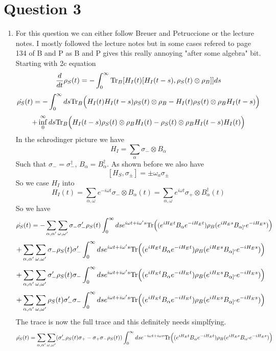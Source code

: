 \documentclass[12pt]{article}
\newcommand{\Tr}{{\rm Tr}}
\begin{document}
\section{Question 3}
\begin{enumerate}
\item For this question we can either follow Breuer and Petruccione or the lecture notes. I mostly followed the lecture notes but in some cases refered to page 134 of B and P as B and P gives this really annoying "after some algebra" bit. Starting with 2c equation 
$$ \frac{d}{dt} \rho_S (t) = - \int_0^{\infty} \Tr_B [ H_I (t) [H_I (t-s), \rho_S (t) \otimes \rho_B]] ds $$
$$ \dot{\rho_S} (t) = - \int_0^{\infty} ds \Tr_B \Big( H_I (t) H_I (t-s) \rho_S (t) \otimes \rho_B - H_I (t) \rho_S (t) \otimes  \rho_B H_I (t-s) \Big) $$
 $$ + \inf_0^{\infty} ds \Tr_B \Big( H_I (t-s) \rho_S (t) \otimes \rho_B H_I (t) - \rho_S (t) \otimes \rho_B H_I (t-s) H_I (t) \Big) $$
 In the schrodinger picture we have 
$$ H_I = \sum_{\alpha} \sigma_- \otimes B_{\alpha} $$
Such that $\sigma_- = \sigma_-^{\dagger}$, $B_{\alpha} = B_{\alpha}^{\dagger}$. As shown before we also have 
$$ [H_S, \sigma_{\pm} ] = \pm \omega_a \sigma_{\pm} $$
So we case $H_I$ into 
$$ H_I (t) = \sum_{\alpha, \omega} e^{-i \omega t} \sigma_- \otimes B_{\alpha} (t) = \sum_{\alpha, \omega} e^{i \omega t} \sigma_+ \otimes B_{\alpha}^{\dagger} (t) $$
So we have 
$$ \dot{\rho_S} (t) = - \sum_{\alpha, \alpha'} \sum_{\omega, \omega'} \sigma_- \sigma_{-}' \rho_S (t) \int_0^{\infty} ds e^{i \omega t + i \omega' s} \Tr \Big( (e^{i H_E t} B_{\alpha} e^{-i H_E t} ) \rho_B ( e^{i H_E s} B_{\alpha]' } e^{-i H_E s} ) \Big) $$
$$ + \sum_{\alpha, \alpha'} \sum_{\omega, \omega'} \sigma_- \rho_S (t) \sigma_{-}' \int_0^{\infty} ds e^{i \omega t + i \omega' s} \Tr \Big( (e^{i H_E t} B_{\alpha} e^{-i H_E t} ) \rho_B ( e^{i H_E s} B_{\alpha]' } e^{-i H_E s} ) \Big) $$
$$ + \sum_{\alpha, \alpha'} \sum_{\omega, \omega'} \sigma_{-}' \rho_S (t) \sigma_- \int_0^{\infty} ds e^{i \omega t + i \omega' s} \Tr \Big( (e^{i H_E t} B_{\alpha} e^{-i H_E t} ) \rho_B ( e^{i H_E s} B_{\alpha]' } e^{-i H_E s} ) \Big) $$
$$ + \sum_{\alpha, \alpha'} \sum_{\omega, \omega'} \rho_S (t) \sigma_{-}' \sigma_-   \int_0^{\infty} ds e^{i \omega t + i \omega' s} \Tr \Big( (e^{i H_E t} B_{\alpha} e^{-i H_E t} ) \rho_B ( e^{i H_E s} B_{\alpha]' } e^{-i H_E s} ) \Big) $$
The trace is now the full trace and this definitely needs simplfying. 
$$ \dot{\rho_S} (t) = \sum_{\alpha, \alpha'} \sum_{\omega, \omega'} ( \sigma_-' \rho_S (t) \sigma_+ - \sigma_+ \sigma_- \rho_S (t) ) \int_0^{\infty} ds e^{-i \omega t + i \omega s} \Tr \Big( ( e^{i H_E t} B_{\alpha} e^{-i H_E t} ) \rho_B ( e^{i H_E s} B_{\alpha'} e^{-i H_E s} ) \Big) $$

\end{enumerate}
\end{document}
